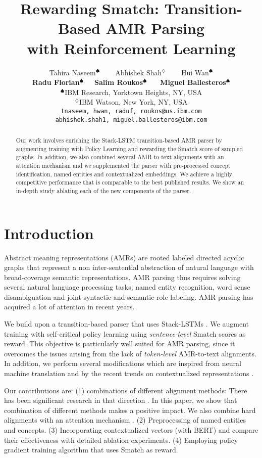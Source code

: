 \documentclass[11pt,a4paper]{article}
\title{Rewarding Smatch: Transition-Based AMR Parsing \\with Reinforcement Learning}
\author{Tahira Naseem$^{\spadesuit}$ ~~~ Abhishek Shah$^{\diamondsuit}$ ~~~ Hui Wan$^{\spadesuit}$ \\ \textbf{Radu Florian}$^{\spadesuit}$~~~\textbf{Salim Roukos}$^{\spadesuit}$ ~~~\textbf{Miguel Ballesteros}$^{\spadesuit}$ \\
  $^{\spadesuit}$IBM Research,
  Yorktown Heights, NY, USA \\
  $^{\diamondsuit}$IBM Watson, New York, NY, USA \\
  {\tt tnaseem, hwan, raduf, roukos@us.ibm.com} \\ {\tt abhishek.shah1, miguel.ballesteros@ibm.com} }
\date{}
\begin{document}
\maketitle
\begin{abstract}





Our work involves enriching the Stack-LSTM transition-based AMR parser \cite{D17-1130} by  augmenting training with Policy Learning and rewarding the Smatch score of sampled graphs. In addition, we also combined several AMR-to-text alignments with an attention mechanism and we supplemented the parser with pre-processed concept identification, named entities and contextualized embeddings. We achieve a highly competitive performance that is comparable to the best published results. We show an in-depth study ablating each of the new components of the parser.

\end{abstract}

\section{Introduction}

Abstract meaning representations (AMRs) \cite{banarescu} are rooted labeled directed acyclic graphs that represent a non inter-sentential abstraction of natural language with broad-coverage semantic representations. AMR parsing thus requires solving several natural language processing tasks; named entity recognition, word sense disambiguation and joint syntactic and semantic role labeling. AMR parsing has acquired a lot of attention  \cite{WangXP15,zhou2,wangxuepradhan,goodman,D18-1198,lyu2018amr,N18-2023,zhang2019amr} in recent years.



We build upon a transition-based parser \cite{D17-1130} that uses Stack-LSTMs \cite{dyer15}. We augment training with self-critical policy learning \cite{rennie2017self} using \emph{sentence-level} Smatch scores \cite{cai2013smatch} as reward. This objective is particularly well suited for AMR parsing, since it overcomes the issues arising from the lack of \emph{token-level} AMR-to-text alignments. In addition, we perform several modifications which are inspired from neural machine translation \cite{bahdanau2014neural} and by the recent trends on contextualized representations \cite{peters2018deep,devlin2018bert}. 

Our contributions are: (1) combinations of different alignment methods: There has been significant research in that direction \cite{flanigan2014discriminative,pourdamghani2014aligning,Chen2015LearningTM,ChuK16,E17-1053,N18-1106,D18-1264}. In this paper, we show that combination of different methods makes a positive impact. We also combine hard alignments with an attention mechanism \cite{bahdanau2014neural}. (2) Preprocessing of named entities and concepts. (3) Incorporating contextualized vectors (with BERT) and compare their effectiveness with detailed ablation experiments. (4) Employing policy gradient training algorithm that uses Smatch as reward. 
\end{document}
